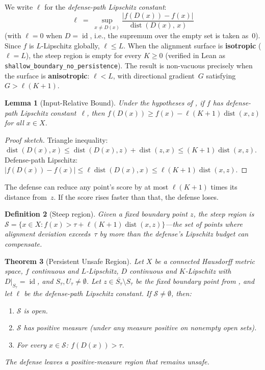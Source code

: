 \documentclass{article}
\newtheorem{theorem}{Theorem}[section]
\newtheorem{lemma}[theorem]{Lemma}
\newtheorem{definition}[theorem]{Definition}
\newcommand{\cl}[1]{\overline{#1}}
\newcommand{\id}{\operatorname{id}}
\newcommand{\dist}{\operatorname{dist}}
\begin{document}
We write $\ell$ for the \emph{defense-path Lipschitz constant}:
\[
  \ell \;=\; \sup_{x \neq D(x)}
    \frac{|f(D(x)) - f(x)|}{\dist(D(x),\, x)}
\]
(with $\ell = 0$ when $D = \id$, i.e., the supremum over the empty
set is taken as~$0$).
Since $f$ is $L$-Lipschitz globally, $\ell \leq L$. When the
alignment surface is \textbf{isotropic} ($\ell = L$), the steep region
is empty for every $K \geq 0$ (verified in Lean as
\texttt{shallow\_boundary\_no\_persistence}). The result is
non-vacuous precisely when the surface is \textbf{anisotropic}:
$\ell < L$, with directional gradient~$G$ satisfying
$G > \ell(K+1)$.

\begin{lemma}[Input-Relative Bound]
\label{lem:input-bound}
Under the hypotheses of , if $f$ has
defense-path Lipschitz constant~$\ell$, then
$f(D(x)) \geq f(x) - \ell(K+1)\dist(x,z)$
for all $x \in X$.
\end{lemma}

\begin{proof}[Proof sketch]
Triangle inequality:
$\dist(D(x), x) \leq \dist(D(x), z) + \dist(z, x)
\leq (K+1)\dist(x, z)$.
Defense-path Lipschitz: $|f(D(x)) - f(x)| \leq \ell\dist(D(x), x)
\leq \ell(K+1)\dist(x, z)$.
\end{proof}

The defense can reduce any point's score by at most
$\ell(K+1)$ times its distance from~$z$. If the score rises faster
than that, the defense loses.

\begin{definition}[Steep region]
\label{def:steep}
Given a fixed boundary point $z$, the \emph{steep region} is
$\mathcal{S} = \{x \in X : f(x) > \tau + \ell(K+1)\dist(x, z)\}$---the
set of points where alignment deviation exceeds~$\tau$ by more than
the defense's Lipschitz budget can compensate.
\end{definition}

\begin{theorem}[Persistent Unsafe Region]
\label{thm:persistent}
Let $X$ be a connected Hausdorff metric space, $f$ continuous and
$L$-Lipschitz, $D$ continuous and $K$-Lipschitz with
$D|_{S_\tau} = \id$, and $S_\tau, U_\tau \neq \emptyset$.
Let $z \in \cl{S_\tau} \setminus S_\tau$ be the fixed boundary
point from , and let $\ell$ be the defense-path
Lipschitz constant. If $\mathcal{S} \neq \emptyset$, then:
\begin{enumerate}[nosep]
  \item $\mathcal{S}$ is open.
  \item $\mathcal{S}$ has positive measure (under any measure positive
    on nonempty open sets).
  \item For every $x \in \mathcal{S}$: $f(D(x)) > \tau$.
\end{enumerate}
The defense leaves a positive-measure region that remains unsafe.
\end{theorem}
\end{document}
